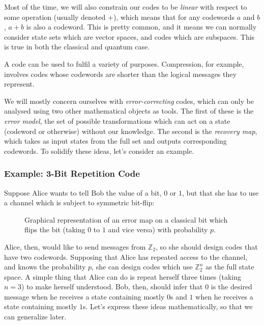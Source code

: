 \documentclass[10pt,a4paper, english]{scrartcl}
\begin{document}
Most of the time, we will also constrain our codes to be \emph{linear} with respect to some operation (usually denoted $+$), which means that for any codewords $a$ and $b$, $a + b$ is also a codeword. 
This is pretty common, and it means we can normally consider state sets which are vector spaces, and codes which are subspaces. 
This is true in both the classical and quantum case. 

A code can be used to fulfil a variety of purposes.
Compression, for example, involves codes whose codewords are shorter than the logical messages they represent.

We will mostly concern ourselves with \emph{error-correcting} codes, which can only be analysed using two other mathematical objects as tools.
The first of these is the \emph{error model}, the set of possible transformations which can act on a state (codeword or otherwise) without our knowledge. 
The second is the \emph{recovery map}, which takes as input states from the full set and outputs corresponding codewords. 
To solidify these ideas, let's consider an example.
\subsubsection{Example: 3-Bit Repetition Code}
Suppose Alice wants to tell Bob the value of a bit, $0$ or $1$, but that she has to use a channel which is subject to symmetric bit-flip:
\begin{figure}[!h]
\centering
{}
\caption{Graphical representation of an error map on a classical bit which flips the bit (taking $0$ to $1$ and vice versa) with probability $p$.}
\end{figure}

Alice, then, would like to send messages from $\mathbb{Z}_2$, so she should design codes that have two codewords. 
Supposing that Alice has repeated access to the channel, and knows the probability $p$, she can design codes which use $\mathbb{Z}_2^n$ as the full state space. 
A simple thing that Alice can do is repeat herself three times (taking $n=3$) to make herself understood.
Bob, then, should infer that $0$ is the desired message when he receives a state containing mostly $0$s and $1$ when he receives a state containing mostly $1$s. 
Let's express these ideas mathematically, so that we can generalize later.
\end{document}
